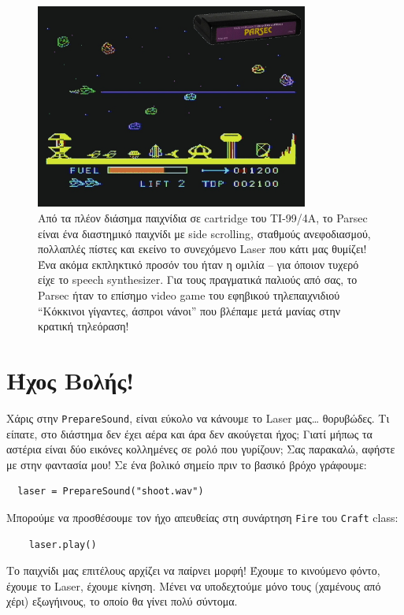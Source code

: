 \begin{figure}
\centering
\includegraphics[width=0.8\textwidth]{images/chapter8/parsec}
\caption[Parsec]{Από τα πλέον διάσημα παιχνίδια σε cartridge του TI-99/4A, το Parsec είναι ένα διαστημικό παιχνίδι με side scrolling, σταθμούς ανεφοδιασμού, πολλαπλές πίστες και εκείνο το συνεχόμενο Laser που κάτι μας θυμίζει! Ένα ακόμα εκπληκτικό προσόν του ήταν η ομιλία -- για όποιον τυχερό είχε το speech synthesizer. Για τους πραγματικά παλιούς από σας, το Parsec ήταν το επίσημο video game του εφηβικού τηλεπαιχνιδιού ``Κόκκινοι γίγαντες, άσπροι νάνοι'' που βλέπαμε μετά μανίας στην κρατική τηλεόραση!}
\label{8-4}
\end{figure}
%
\section{Ήχος Βολής!}
%
Χάρις στην {\tt PrepareSound}, είναι εύκολο να κάνουμε το Laser μας\ldots{} θορυβώδες. Τι είπατε, στο διάστημα δεν έχει αέρα και άρα δεν ακούγεται ήχος; Γιατί μήπως τα αστέρια είναι δύο εικόνες κολλημένες σε ρολό που γυρίζουν; Σας παρακαλώ, αφήστε με στην φαντασία μου! Σε ένα βολικό σημείο πριν το βασικό βρόχο γράφουμε:

\begin{verbatim}
  laser = PrepareSound("shoot.wav")
\end{verbatim}

Μπορούμε να προσθέσουμε τον ήχο απευθείας στη συνάρτηση {\tt Fire} του {\tt Craft} class:

\begin{verbatim}
    laser.play()
\end{verbatim}

Το παιχνίδι μας επιτέλους αρχίζει να παίρνει μορφή! Έχουμε το κινούμενο φόντο, έχουμε το Laser, έχουμε κίνηση. Μένει να υποδεχτούμε μόνο τους (χαμένους από χέρι) εξωγήινους, το οποίο θα γίνει πολύ σύντομα.
